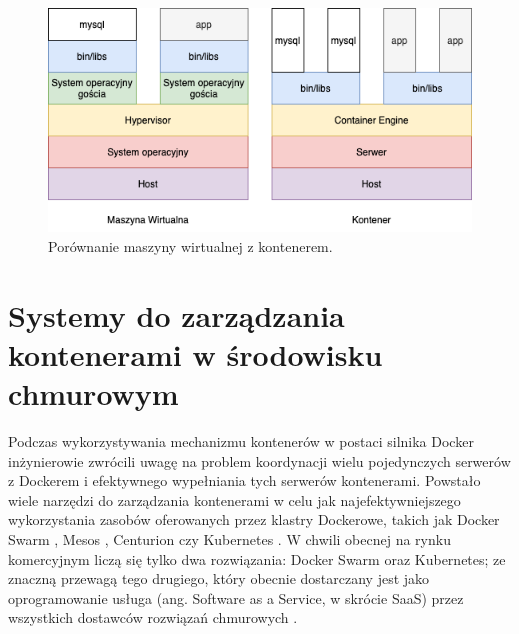 \begin{figure}[!ht]
\centering
\includegraphics[width=.8\textwidth]{Chapters/Rozwiazanie/docker/vm-vs-docker.png}
\caption{Porównanie maszyny wirtualnej z kontenerem.}
\label{fig:chapter3:vm-vs-docker}
\end{figure}

\FloatBarrier


\section{Systemy do zarządzania kontenerami w środowisku chmurowym}
\label{sec:k8s}
Podczas wykorzystywania mechanizmu kontenerów w postaci silnika Docker inżynierowie zwrócili uwagę na problem koordynacji wielu pojedynczych serwerów z Dockerem i efektywnego wypełniania tych serwerów kontenerami. Powstało wiele narzędzi do zarządzania kontenerami w celu jak najefektywniejszego wykorzystania zasobów oferowanych przez klastry Dockerowe, takich jak Docker Swarm \cite{naik2016building}, Mesos \cite{mesos}, Centurion \cite{centurion} czy Kubernetes \cite{burns2018kubernetes}. W chwili obecnej na rynku komercyjnym liczą się tylko dwa rozwiązania: Docker Swarm oraz Kubernetes; ze znaczną przewagą tego drugiego, który obecnie dostarczany jest jako oprogramowanie usługa (ang. Software as a Service, w skrócie SaaS) przez wszystkich dostawców rozwiązań chmurowych \cite{chemashkinkubernetes}. 

